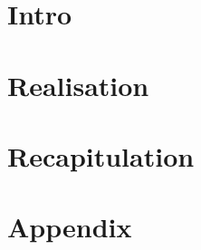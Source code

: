 


	
	
	
	
	\renewcommand{\contentsname}{Table of Content}
	\tableofcontents
	\newpage
	
	\part{Intro}
	
	
	
	\part{Realisation}
	
	
	
	\part{Recapitulation}
	
	
	
	
	

	\part{Appendix}
	\appendix
	
	
